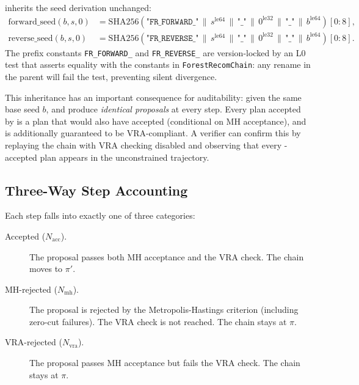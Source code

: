 \vr{} inherits the \fr{} seed derivation unchanged:
\begin{align*}
  \mathrm{forward\_seed}(b, s, 0) &= \mathrm{SHA256}\!\left(
    \texttt{"FR\_FORWARD\_"} \,\|\, s^{\mathrm{le64}} \,\|\,
    \texttt{"\_"} \,\|\, 0^{\mathrm{le32}} \,\|\,
    \texttt{"\_"} \,\|\, b^{\mathrm{le64}}
  \right)[0{:}8], \\
  \mathrm{reverse\_seed}(b, s, 0) &= \mathrm{SHA256}\!\left(
    \texttt{"FR\_REVERSE\_"} \,\|\, s^{\mathrm{le64}} \,\|\,
    \texttt{"\_"} \,\|\, 0^{\mathrm{le32}} \,\|\,
    \texttt{"\_"} \,\|\, b^{\mathrm{le64}}
  \right)[0{:}8].
\end{align*}
The prefix constants \texttt{FR\_FORWARD\_} and \texttt{FR\_REVERSE\_} are
version-locked by an L0 test that asserts equality with the constants in
\texttt{ForestRecomChain}: any rename in the parent will fail the test,
preventing silent divergence.

This inheritance has an important consequence for auditability: given the same
base seed $b$, \vr{} and \fr{} produce \emph{identical proposals} at every
step.
Every plan accepted by \vr{} is a plan that \fr{} would also have accepted
(conditional on MH acceptance), and is additionally guaranteed to be
VRA-compliant.
A verifier can confirm this by replaying the chain with VRA checking disabled
and observing that every \vr{}-accepted plan appears in the unconstrained
trajectory.

\subsection{Three-Way Step Accounting}

Each step falls into exactly one of three categories:

\begin{description}
  \item[Accepted ($N_{\mathrm{acc}}$).]
        The proposal passes both MH acceptance and the VRA check.
        The chain moves to $\pi'$.
  \item[MH-rejected ($N_{\mathrm{mh}}$).]
        The proposal is rejected by the Metropolis-Hastings criterion
        (including zero-cut failures).
        The VRA check is not reached.
        The chain stays at $\pi$.
  \item[VRA-rejected ($N_{\mathrm{vra}}$).]
        The proposal passes MH acceptance but fails the VRA check.
        The chain stays at $\pi$.
\end{description}

